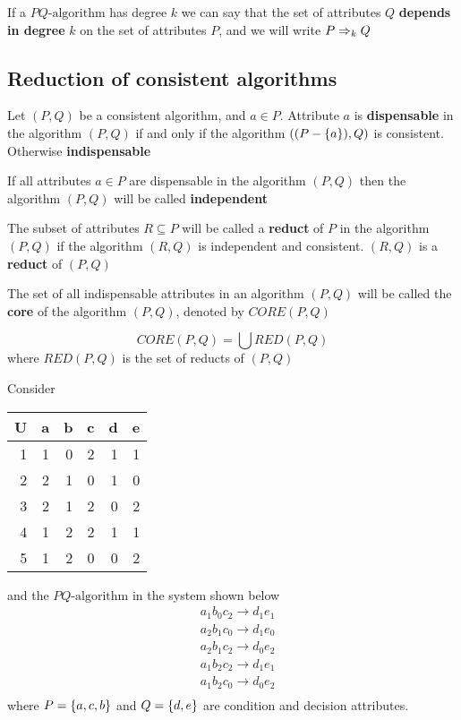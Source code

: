 \documentclass[11pt]{article}
\begin{document}
If a \(PQ\text{-algorithm}\) has degree \(k\) we can say that the set of
attributes \(Q\) \textbf{depends in degree} \(k\) on the set of attributes \(P\), and we
will write \(P\Rightarrow_k Q\)
\subsection{Reduction of consistent algorithms}
\label{sec:org1cb3fea}
Let \((P,Q)\) be a consistent algorithm, and \(a\in P\). Attribute \(a\) is
\textbf{dispensable} in the algorithm \((P,Q)\) if and only if the algorithm 
\(((P-\left\{ a\right\}),Q)\) is consistent. Otherwise \textbf{indispensable}

If all attributes \(a\in P\) are dispensable in the algorithm \((P,Q)\) then the
algorithm \((P,Q)\) will be called \textbf{independent}

The subset of attributes \(R\subseteq P\) will be called a \textbf{reduct} of \(P\) in the
algorithm \((P,Q)\) if the algorithm \((R,Q)\) is independent and consistent.
\((R,Q)\) is a \textbf{reduct} of \((P,Q)\)

The set of all indispensable attributes in an algorithm \((P,Q)\) will be
called the \textbf{core} of the algorithm \((P,Q)\), denoted by \(CORE(P,Q)\)

\begin{proposition}[7.7]
\begin{equation*}
CORE(P,Q)=\bigcup RED(P,Q)
\end{equation*}
where \(RED(P,Q)\) is the set of reducts of \((P,Q)\)
\end{proposition}

Consider
\begin{center}
\begin{tabular}{rrrrrr}
U & a & b & c & d & e\\
\hline
1 & 1 & 0 & 2 & 1 & 1\\
2 & 2 & 1 & 0 & 1 & 0\\
3 & 2 & 1 & 2 & 0 & 2\\
4 & 1 & 2 & 2 & 1 & 1\\
5 & 1 & 2 & 0 & 0 & 2\\
\end{tabular}
\end{center}
and the \(PQ\text{-algorithm}\) in the system shown below
\begin{align*}
  &a_1b_0c_2\to d_1e_1\\
  &a_2b_1c_0\to d_1e_0\\
  &a_2b_1c_2\to d_0e_2\\
  &a_1b_2c_2\to d_1e_1\\
  &a_1b_2c_0\to d_0e_2\\
\end{align*}
where \(P=\left\{ a,c,b\right\}\) and \(Q=\left\{ d,e\right\}\) are condition and decision
attributes.
\end{document}
